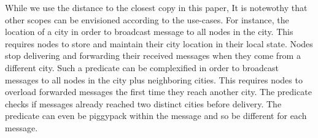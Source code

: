 While we use the distance to the closest copy in this paper, It is
notewothy that other scopes can be envisioned according to the
use-cases.  For instance, the location of a city in order to broadcast
message to all nodes in the city.  This requires nodes to store and
maintain their city location in their local state. Nodes stop
delivering and forwarding their received messages when they come from
a different city. Such a predicate can be complexified in order to
broadcast messages to all nodes in the city plus neighboring
cities. This requires nodes to overload forwarded messages the first
time they reach another city. The predicate checks if messages already
reached two distinct cities before delivery.  The predicate can even
be piggypack within the message and so be different for each
message.


